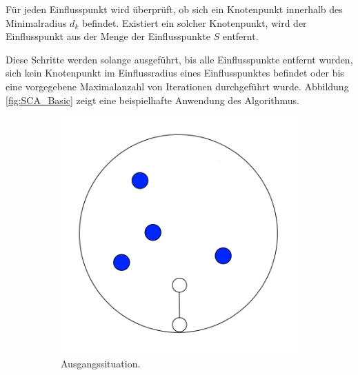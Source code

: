 \begin{description}[labelindent]
	\item[\boldmath$3.$] Für jeden Einflusspunkt wird überprüft, ob sich ein Knotenpunkt innerhalb des Minimalradius $d_k$ befindet. Existiert ein solcher Knotenpunkt, wird der Einflusspunkt aus der Menge der Einflusspunkte $S$ entfernt. \cite[Abschn. 2]{SpaceColonizationAlgorithm:07} \label{alg:SCA_3}
\end{description}

Diese Schritte werden solange ausgeführt, bis alle Einflusspunkte entfernt wurden, sich kein Knotenpunkt im Einflussradius eines Einflusspunktes befindet oder bis eine vorgegebene Maximalanzahl von Iterationen durchgeführt wurde. Abbildung \ref{fig:SCA_Basic} zeigt eine beispielhafte Anwendung des Algorithmus.

\begin{figure} [hbtp]
	\centering
	\begin{subfigure}[t]{.31\textwidth}
		\centering
		\includegraphics[width=\linewidth]{images/SCA_Basic1.png}
		\caption{ Ausgangssituation. }
		\label{subfig:SCA_Basic1}
	\end{subfigure}
	\hspace{.01\textwidth}
	\begin{subfigure}[t]{.31\textwidth}
		\centering

\end{subfigure}
\end{figure}
